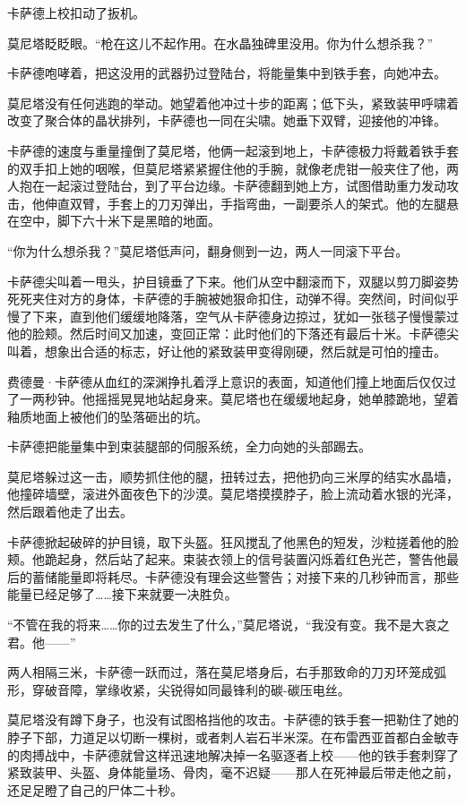 \documentclass[AutoFakeBold=true]{book}
\begin{document}
卡萨德上校扣动了扳机。

莫尼塔眨眨眼。``枪在这儿不起作用。在水晶独碑里没用。你为什么想杀我？''

卡萨德咆哮着，把这没用的武器扔过登陆台，将能量集中到铁手套，向她冲去。

莫尼塔没有任何逃跑的举动。她望着他冲过十步的距离；低下头，紧致装甲呼啸着改变了聚合体的晶状排列，卡萨德也一同在尖啸。她垂下双臂，迎接他的冲锋。

卡萨德的速度与重量撞倒了莫尼塔，他俩一起滚到地上，卡萨德极力将戴着铁手套的双手扣上她的咽喉，但莫尼塔紧紧握住他的手腕，就像老虎钳一般夹住了他，两人抱在一起滚过登陆台，到了平台边缘。卡萨德翻到她上方，试图借助重力发动攻击，他伸直双臂，手套上的刀刃弹出，手指弯曲，一副要杀人的架式。他的左腿悬在空中，脚下六十米下是黑暗的地面。

``你为什么想杀我？''莫尼塔低声问，翻身侧到一边，两人一同滚下平台。

卡萨德尖叫着一甩头，护目镜垂了下来。他们从空中翻滚而下，双腿以剪刀脚姿势死死夹住对方的身体，卡萨德的手腕被她狠命扣住，动弹不得。突然间，时间似乎慢了下来，直到他们缓缓地降落，空气从卡萨德身边掠过，犹如一张毯子慢慢蒙过他的脸颊。然后时间又加速，变回正常：此时他们的下落还有最后十米。卡萨德尖叫着，想象出合适的标志，好让他的紧致装甲变得刚硬，然后就是可怕的撞击。

费德曼·卡萨德从血红的深渊挣扎着浮上意识的表面，知道他们撞上地面后仅仅过了一两秒钟。他摇摇晃晃地站起身来。莫尼塔也在缓缓地起身，她单膝跪地，望着釉质地面上被他们的坠落砸出的坑。

卡萨德把能量集中到束装腿部的伺服系统，全力向她的头部踢去。

莫尼塔躲过这一击，顺势抓住他的腿，扭转过去，把他扔向三米厚的结实水晶墙，他撞碎墙壁，滚进外面夜色下的沙漠。莫尼塔摸摸脖子，脸上流动着水银的光泽，然后跟着他走了出去。

卡萨德掀起破碎的护目镜，取下头盔。狂风搅乱了他黑色的短发，沙粒搓着他的脸颊。他跪起身，然后站了起来。束装衣领上的信号装置闪烁着红色光芒，警告他最后的蓄储能量即将耗尽。卡萨德没有理会这些警告；对接下来的几秒钟而言，那些能量已经足够了……接下来就要一决胜负。

``不管在我的将来……你的过去发生了什么，''莫尼塔说，``我没有变。我不是大哀之君。他——''

两人相隔三米，卡萨德一跃而过，落在莫尼塔{\kaishu 身后}，右手那致命的刀刃环笼成弧形，穿破音障，掌缘收紧，尖锐得如同最锋利的碳-碳压电丝。

莫尼塔没有蹲下身子，也没有试图格挡他的攻击。卡萨德的铁手套一把勒住了她的脖子下部，力道足以切断一棵树，或者刺人岩石半米深。在布雷西亚首都白金敏寺的肉搏战中，卡萨德就曾这样迅速地解决掉一名驱逐者上校——他的铁手套刺穿了紧致装甲、头盔、身体能量场、骨肉，毫不迟疑——那人在死神最后带走他之前，还足足瞪了自己的尸体二十秒。
\end{document}
